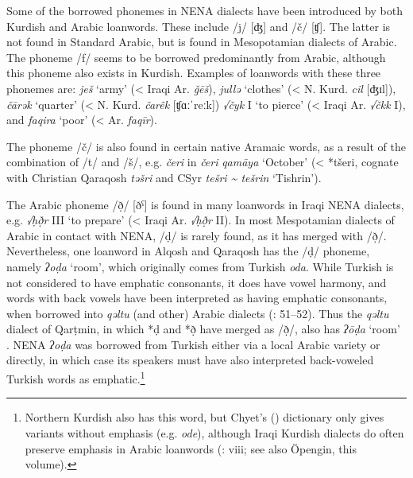 \documentclass[output=paper]{langsci/langscibook}
\begin{document}
Some of the borrowed phonemes in NENA dialects have been introduced by both Kurdish and Arabic loanwords. These include /j/ [ʤ] and /č/ [ʧ]. The latter is not found in Standard Arabic, but is found in Mesopotamian dialects of Arabic. The phoneme /f/ seems to be borrowed predominantly from Arabic, although this phoneme also exists in Kurdish. Examples of loanwords with these three phonemes are: \textit{ješ} ‘army’ (< Iraqi Ar. \textit{ǧēš}), \textit{jullə} ‘clothes’ (< N. Kurd. \textit{cil} [ʤɪl]), \textit{čārək} ‘quarter’ (< N. Kurd. \textit{čarêk} [ʧɑːˈreːk]) \textit{√čyk} I ‘to pierce’ (< Iraqi Ar. \textit{√čkk} I), and \textit{faqira} ‘poor’ (< Ar. \textit{faqīr}).

The phoneme /č/ is also found in certain native Aramaic words, as a result of the combination of /t/ and /š/, e.g. \textit{čeri} in \textit{čeri} \textit{qamāya} ‘October’ (< *tšeri, cognate with Christian Qaraqosh \textit{təšri} and CSyr \textit{tešri {\textasciitilde} tešrin} ‘Tishrin’).

The Arabic phoneme /ð̣/ [ðˁ] is found in many loanwords in Iraqi NENA dialects, e.g. \textit{√ḥð̣r} III ‘to prepare’ (< Iraqi Ar. \textit{√ḥð̣r} II). In most Mespotamian dialects of Arabic in contact with NENA, /ḍ/ is rarely found, as it has merged with /ð̣/. Nevertheless, one loanword in Alqosh and Qaraqosh has the /ḍ/ phoneme, namely \textit{ʔoḍa} ‘room’, which originally comes from Turkish \textit{oda}. While Turkish is not considered to have emphatic consonants, it does have vowel harmony, and words with back vowels have been interpreted as having emphatic consonants, when borrowed into \textit{qəltu} (and other) Arabic dialects (\citealt{Jastrow1978}: 51–52). Thus the \textit{qəltu} dialect of Qarṭmin, in which *ḍ and *ð̣ have merged as /ð̣/, also has \textit{ʔōḍa} ‘room’ \citep[70]{Jastrow1978}. NENA \textit{ʔoḍa} was borrowed from Turkish either via a local Arabic variety or directly, in which case its speakers must have also interpreted back-voweled Turkish words as emphatic.\footnote{Northern Kurdish also has this word, but Chyet's (\citeyear{Chyet2003}) dictionary only gives variants without emphasis (e.g. \textit{ode}), although Iraqi Kurdish dialects do often preserve emphasis in Arabic loanwords (\citealt{Chyet2003}: viii; see also Öpengin, this volume).}
\end{document}
